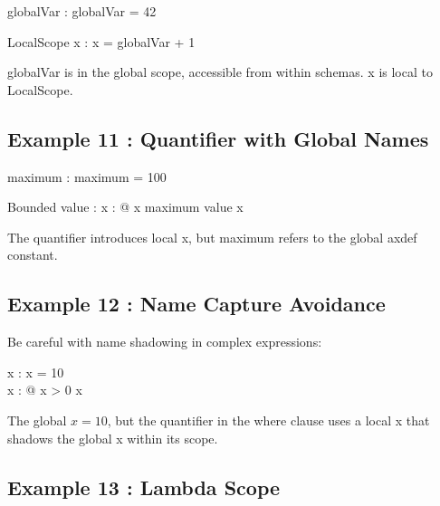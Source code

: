 \documentclass[a4paper,10pt,fleqn]{article}
\begin{document}
\begin{axdef}
globalVar : \nat
\where
globalVar = 42
\end{axdef}

\begin{schema}{LocalScope}
x : \nat
\where
x = globalVar + 1
\end{schema}

\noindent globalVar is in the global scope, accessible from within schemas. x is local to LocalScope.

\bigskip

\subsection*{Example 11 : Quantifier with Global Names}

\begin{axdef}
maximum : \nat
\where
maximum = 100
\end{axdef}

\begin{schema}{Bounded}
value : \nat
\where
\forall x : \nat @ x \leq maximum \implies value \leq x
\end{schema}

\noindent The quantifier introduces local x, but maximum refers to the global axdef constant.

\bigskip

\subsection*{Example 12 : Name Capture Avoidance}

\noindent Be careful with name shadowing in complex expressions:

\bigskip

\begin{axdef}
x : \nat
\where
x = 10 \\
\forall x : \nat @ x > 0 \implies x 
\end{axdef}

\noindent The global $x = 10$, but the quantifier in the where clause uses a local x that shadows the global x within its scope.

\bigskip

\subsection*{Example 13 : Lambda Scope}
\end{document}
